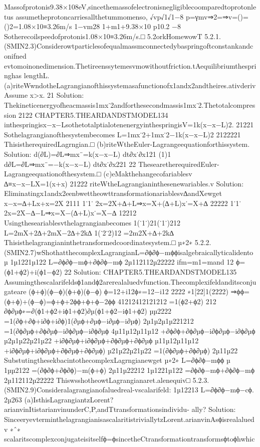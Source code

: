 {{{{{{{{{{Massofprotonis9.38×108eV,sincethemassofelectronisnegligiblecoomparedtoprotonletus
assumetheprotoncarriesallthetummomenso,
√vp√1√1−8
p=γmv⇒2=⇒v=()=()2=1.08×10≡3.26m/s
1−vm28
1+m1+9.38×10
p10.2
−8
Sotherecoilspeedofprotonis1.08×10≡3.26m/s.□
5.2orkHomewowT
5.2.1.(SMIN2.3)Considerowtparticlesofequalmassmconnectedybaspringoftconstankandconifned
evtomoinonedimension.Thetireenssytemesvmowithoutfriction.tAequilibriumthespringhas
lengthL.
(a)riteWwndotheLagrangianofthissystemasafunctionofx1andx2andtheires.ativderivAssume
x>x.
21
Solution:
Thekineticenergyofheacmassis1mx˙2andforthesecondmassis1mx˙2.Thetotalcompression
2122
CHAPTER5.THEARDANDSTMODEL134
inthespringisx−x−LsothetotalptialotenenergyinthespringisV=1k(x−x−L)2.
21221
Sothelagrangianofthesystembecomes
L=1mx˙2+1mx˙2−1k(x−x−L)2
2122221
ThisistherequiredLagrngian.□
(b)riteWtheEuler-Lagrangeequationforthissystem.
Solution:
d(∂L)=∂L⇒mx¨=k(x−x−L)
dt∂x˙∂x121
(1)1
d∂L=∂L⇒mx¨=−k(x−x−L)
dt∂x˙∂x221
22
ThesearetherequiredEuler-Lagrangeequationofthesystem.□
(c)eMakthehangecofariablesv
∆≡x−x−LX=1(x+x)
21222
riteWtheLagrangianinthesenewariables.v
Solution:
Eliminatingx1andx2eenbwettheowttransformationariablesv∆andXewget
x−x=∆+Lx+x=2X
2111
1˙1˙
2x=2X+∆+L⇒x=X+(∆+L)x˙=X+∆
22222
1˙1˙
2x=2X−∆−L⇒x=X−(∆+L)x˙=X−∆
12212
Usingtheseariablesvthelagrangianbecomes
1(˙1˙)21(˙1˙)212
L=2mX+2∆+2mX−2∆+2k∆
1(˙2˙2)12
=2m2X+∆+2k∆
Thisisthelagrangianinthetransformedcoordinatesystem.□
µ∗2∗
5.2.2.(SMIN2.7)wShothatthecomplexLagrangianL=∂ϕ∂ϕ−mϕϕisalgebraicallyticalidento
µ
1µ1221µ122
L=∂ϕ∂ϕ−mϕ+∂ϕ∂ϕ−mϕ
2µ112112µ22222
ifm=m1=mand
12
ϕ=(ϕ1+ϕ2)+i(ϕ1−ϕ2)
22
Solution:
CHAPTER5.THEARDANDSTMODEL135
Assumingthescalarifeldsϕ1andϕ2arerealaluedvfunction.Thecomplexifeldanditsconjugateare
(ϕ+ϕ)(ϕ−ϕ)(ϕ+ϕ)(ϕ−ϕ)
ϕ=12+i12ϕ∗=12−i12
2222
∗1[22]1(2222)
⇒ϕϕ=(ϕ+ϕ)+(ϕ−ϕ)=ϕ+ϕ+2ϕϕ+ϕ+ϕ−2ϕϕ
41212412121212
=1(ϕ2+ϕ2)
212
∂ϕ∂µϕ∗=∂(ϕ1+ϕ2+iϕ1+ϕ2)∂µ(ϕ1+ϕ2−iϕ1+ϕ2)
µµ2222
=1(∂ϕ+∂ϕ+i∂ϕ+i∂ϕ)1(∂µϕ+∂µϕ−i∂µϕ−i∂µϕ)
2µ1µ2µ1µ221212
=1(∂ϕ∂µϕ+∂ϕ∂µϕ−i∂ϕ∂µϕ−i∂ϕ∂µϕ
4µ11µ12µ11µ12
+∂ϕ∂ϕ+∂ϕ∂µϕ−i∂ϕ∂µϕ−i∂ϕ∂µϕ
µ2µ1µ22µ21µ22
+i∂ϕ∂µϕ+i∂ϕ∂µϕ+∂ϕ∂µϕ+∂ϕ∂µϕ
µ11µ12µ11µ12
+i∂ϕ∂µϕ+i∂ϕ∂µϕ+∂ϕ∂µϕ+∂ϕ∂µϕ)
µ21µ22µ21µ22
=1(∂ϕ∂µϕ+∂ϕ∂µϕ)
2µ11µ22
SubstutingthesekbacintothecomplexLagrngianewget
µ∗2∗
L=∂ϕ∂ϕ−mϕϕ
µ
1µµ2122
=(∂ϕ∂ϕ+∂ϕ∂ϕ)−m(ϕ+ϕ)
2µ11µ22212
1µ1221µ122
=∂ϕ∂ϕ−mϕ+∂ϕ∂ϕ−mϕ
2µ112112µ22222
ThiswsshotheowtLagrangianaret.alenequiv□
5.2.3.(SMIN2.9)Consideralagrangianofaluedreal-vscalarifeld:
1µ12213
L=∂ϕ∂ϕ−mϕ−cϕ.
2µ263
(a)IsthisLagrangiantzLorent?arianvinItistarianvinunderC,P,andTtransformationsindividu-
ally?
Solution:
SinceeryevterminthelagrangianisascalaritistriviallytzLorent.arianvinAsϕisrealaluedv
∗ˆ∗
scalaritscomplexconjugateisitselfϕ=ϕsincetheCtransformationtransformsϕtoϕhwhic
}}}}}}}}}}
